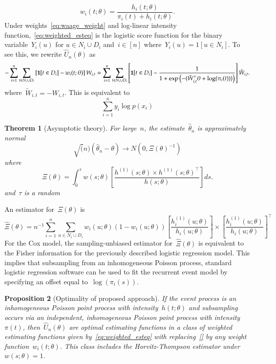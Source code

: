 \documentclass[11pt]{amsart}
\newtheorem{thm}{Theorem}[section]
\newtheorem{prop}[thm]{Proposition}
\begin{document}
\begin{itemize}
\begin{equation}
\label{eq:waage_weight}
w_i (t; \theta) = \frac{h_i(t;\theta)}{\pi_i (t) + h_i (t;\theta)}.
\end{equation}
Under weights~\eqref{eq:waage_weight} and log-linear intensity
function,~\eqref{eq:weighted_esteq} is the logistic score function for
the binary variable~$Y_i(u)$ for $u \in N_i \cup D_i$ and~$i \in [n]$
where~$Y_i(u) = 1[u \in N_i]$. To see this, we rewrite $\hat U_n
(\theta)$ as 
\[
  - \sum_{i=1}^n \sum_{t \in N_i \cup D_i}
    \left[ {\bf 1} [t \in D_i]  - w_{i} (t; \theta) \right] W_{i,t} 
= \sum_{i=1}^n \sum_{t \in N_i \cup D_i}
    \left[ {\bf 1} [t \in D_i]  - \frac{1}{1 + \exp\left( - (
          \tilde W_{i,t}^\top \theta + \log (\pi_i (t) ) ) \right)}
    \right] \tilde W_{i,t}.
\]
where~$\tilde W_{i,t} = - W_{i,t}$.
This is equivalent to
\[
\sum_{i=1}^n y_i \log p (x_i)
\]
\end{itemize}

\begin{thm}[Asymptotic theory]
For large~$n$, the estimate~$\hat \theta_n$ is approximately normal
\[
\sqrt(n) (\hat \theta_n - \theta) \to N(0, \Xi (\theta)^{-1})
\]
where
\[
  \Xi (\theta) = \int_{0}^{\tau} w(s; \theta) \left[ \frac{h^{(1)}(s;
      \theta) \times  h^{(1)} (s;\theta)^{\top}}{h(s; \theta)} \right]
  ds.
\]
and~$\tau$ is a random 
\end{thm}
An estimator for~$\Xi(\theta)$ is
\[
  \hat \Xi (\theta) = n^{-1} \sum_{i=1}^n \sum_{u \in N_i \cup D_i} 
  w_i(u;\theta) (1-w_i(u;\theta)) \left[ \frac{h_i^{(1)}(u;
      \theta)}{h_i (u; \theta)} \right] \times  \left [ \frac{h_i^{(1)} (u;\theta)}{h_i(u; \theta)} \right]^\top
\]
For the Cox model, the sampling-unbiased estimator for~$\hat
\Xi(\theta)$ is equivalent to the Fisher information for the
previously described logistic regression model.
This implies that subsampling from an inhomogeneous Poisson process,
standard logistic regression software can be used to fit the recurrent
event model by specifying an offset equal to~$\log (\pi_i (s))$.

\begin{prop}[Optimality of proposed approach]
\label{prop:optimal}
If the event process is an inhomogeneous Poisson point process with
intensity~$h(t; \theta)$ and subsampling occurs via an independent,
inhomogeneous Poisson point process with intensity~$\pi (t)$,
then~$\hat U_n (\theta)$ are optimal estimating functions in a class
of weighted estimating functions given by~\eqref{eq:weighted_esteq}
with replacing~\eqref{} by any weight function~$w_i (t; \theta)$. This
class includes the Horvitz-Thompson estimator under~$w(s; \theta)
= 1$.
\end{prop}
\end{document}
